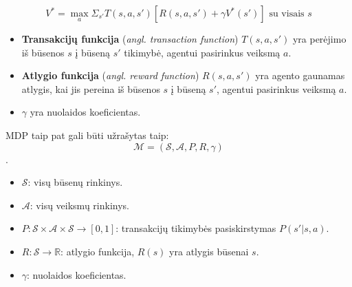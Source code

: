 \documentclass{VUMIFPSbakalaurinis}
\begin{document}
{	\begin{equation}\label{eq:bellmanOptimal}
		V^* = \max_a \Sigma_{s'}T(s, a, s')[R(s, a, s') + \gamma V^*(s')] \textrm{ su visais } s
	\end{equation} 
	
	\begin{itemize}
		\item \textbf{Transakcijų funkcija} (\textit{angl. transaction function}) \(T(s, a, s')\) yra perėjimo iš būsenos \(s\) į būseną \(s'\) tikimybė, agentui pasirinkus veiksmą \(a\).
		\item \textbf{Atlygio funkcija} (\textit{angl. reward function}) \(R(s, a, s')\) yra agento gaunamas atlygis, kai jis pereina iš būsenos \(s\) į būseną \(s'\), agentui pasirinkus veiksmą \(a\).
		\item \(\gamma\) yra nuolaidos koeficientas.
	\end{itemize}

	MDP taip pat gali būti užrašytas taip:
	\[\mathcal{M} = (\mathcal{S}, \mathcal{A}, P, R, \gamma)\].
	\begin{itemize}
		\item \(\mathcal{S}\): visų būsenų rinkinys.
		\item \(\mathcal{A}\): visų veiksmų rinkinys.
		\item \(P : \mathcal{S} \times \mathcal{A} \times \mathcal{S} \rightarrow [0, 1]\): transakcijų tikimybės pasiskirstymas \(P(s'|s, a)\).
		\item \(R : \mathcal{S} \rightarrow \mathbb{R}\): atlygio funkcija, \(R(s)\) yra atlygis būsenai \(s\).
		\item \(\gamma\): nuolaidos koeficientas.
	\end{itemize}
}
\end{document}
